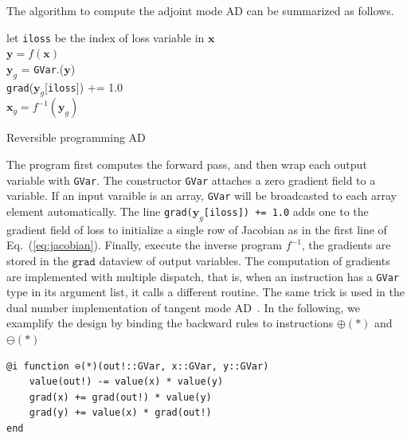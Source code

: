 \documentclass[aps,twocolumn,longbibliography,english,superscriptaddress]{revtex4-1}
\newcommand{\<}{\langle}
\renewcommand{\>}{\rangle}
\newcommand{\vx}{{\mathbf{x}}}
\newcommand{\vy}{{\mathbf{y}}}
\newcommand{\vvalue}{{\texttt{value}}}
\newcommand{\grad}{{\texttt{grad}}}
\newcommand{\Eq}[1]{Eq.~(\ref{#1})}
\theoremstyle{definition}\newtheorem{definition}{\textit{Definition}}
\begin{document}
The algorithm to compute the adjoint mode AD can be summarized as follows.

\begin{algorithm}[H]
    \KwResult{\grad.($\vx_g$)}
    let \texttt{iloss} be the index of loss variable in $\vx$\\
    $\vy = f(\vx)$\\
    $\vy_g$ = \texttt{GVar}.($\vy$)\\
    \grad($\vy_g$[\texttt{iloss}]) += 1.0\\
    $\vx_g= f^{-1}(\vy_g)$
    \caption{Reversible programming AD}\label{alg:ad}
\end{algorithm}

The program first computes the forward pass, and then wrap each output variable with \texttt{GVar}.
The constructor \texttt{GVar} attaches a zero gradient field to a variable. If an input varaible is an array, \texttt{GVar} will be broadcasted to each array element automatically.
The line \texttt{\grad($\vy_g$[\texttt{iloss}]) += 1.0} adds one to the gradient field of loss to initialize a single row of Jacobian as in the first line of \Eq{eq:jacobian}.
Finally, execute the inverse program \texttt{$f^{-1}$}, the gradients are stored in the $\grad$ dataview of output variables.
The computation of gradients are implemented with multiple dispatch, that is, when an instruction has a \texttt{GVar} type in its argument list, it calls a different routine. The same trick is used in the dual number implementation of tangent mode AD~\cite{Revels2016}.
In the following, we examplify the design by binding the backward rules to instructions \texttt{$\oplus(*)$} and \texttt{$\ominus(*)$}

\begin{minipage}{.44\textwidth}
\begin{lstlisting}[mathescape=true]
@i function ⊖(*)(out!::GVar, x::GVar, y::GVar)
    value(out!) -= value(x) * value(y)
    grad(x) += grad(out!) * value(y)
    grad(y) += value(x) * grad(out!)
end
\end{lstlisting}
\end{minipage}
\end{document}
